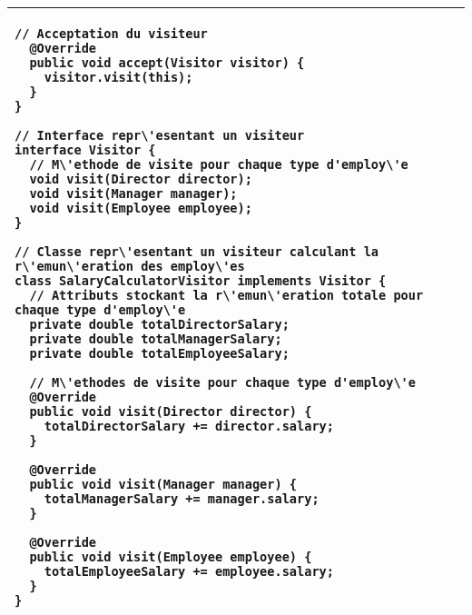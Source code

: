 \begin{minipage}[t]{1\textwidth}
\begin{table}[H]
\begin{adjustbox}{max width=\textwidth}
\begin{tabular}{l|p{\textwidth}}
\begin{minipage}[tr]{0.5\textwidth}
\begin{lstlisting}[style=monstyle]
  // Acceptation du visiteur
  @Override
  public void accept(Visitor visitor) {
    visitor.visit(this);
  }
}

// Interface repr\'esentant un visiteur
interface Visitor {
  // M\'ethode de visite pour chaque type d'employ\'e
  void visit(Director director);
  void visit(Manager manager);
  void visit(Employee employee);
}

// Classe repr\'esentant un visiteur calculant la r\'emun\'eration des employ\'es
class SalaryCalculatorVisitor implements Visitor {
  // Attributs stockant la r\'emun\'eration totale pour chaque type d'employ\'e
  private double totalDirectorSalary;
  private double totalManagerSalary;
  private double totalEmployeeSalary;

  // M\'ethodes de visite pour chaque type d'employ\'e
  @Override
  public void visit(Director director) {
    totalDirectorSalary += director.salary;
  }

  @Override
  public void visit(Manager manager) {
    totalManagerSalary += manager.salary;
  }

  @Override
  public void visit(Employee employee) {
    totalEmployeeSalary += employee.salary;
  }
}
\end{lstlisting}
\end{minipage}
\\


\bottomrule
\end{tabular}
\end{adjustbox}
\end{table}
\end{minipage}

